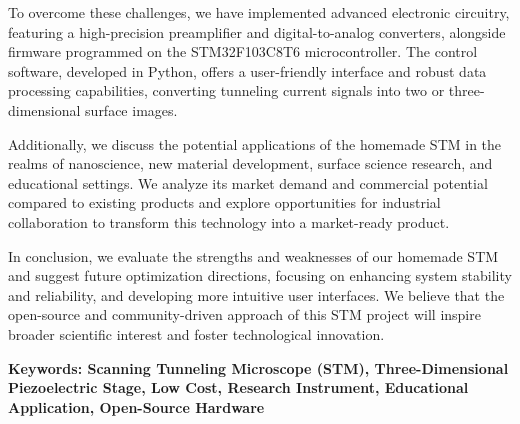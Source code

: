 \documentclass{article}
\begin{document}
\begin{spacing}{1.625}
\begin{adjustwidth}{0.42cm}{0.42cm}
		To overcome these challenges, we have implemented advanced electronic circuitry, featuring a high-precision preamplifier and digital-to-analog converters, alongside firmware programmed on the STM32F103C8T6 microcontroller. The control software, developed in Python, offers a user-friendly interface and robust data processing capabilities, converting tunneling current signals into two or three-dimensional surface images.
		
		Additionally, we discuss the potential applications of the homemade STM in the realms of nanoscience, new material development, surface science research, and educational settings. We analyze its market demand and commercial potential compared to existing products and explore opportunities for industrial collaboration to transform this technology into a market-ready product.
		
		In conclusion, we evaluate the strengths and weaknesses of our homemade STM and suggest future optimization directions, focusing on enhancing system stability and reliability, and developing more intuitive user interfaces. We believe that the open-source and community-driven approach of this STM project will inspire broader scientific interest and foster technological innovation.
		
		
		\textbf{Keywords: Scanning Tunneling Microscope (STM), Three-Dimensional Piezoelectric Stage, Low Cost, Research Instrument, Educational Application, Open-Source Hardware}
	\end{adjustwidth}


\clearpage

\tableofcontents

\clearpage
{%
	\let\oldnumberline\numberline%
	\renewcommand{\numberline}{\figurename~\oldnumberline}%
	\listoffigures%
}

{%
	\let\oldnumberline\numberline%
	\renewcommand{\numberline}{\tablename~\oldnumberline}%
	\listoftables
}



	

\end{spacing}
\end{document}
